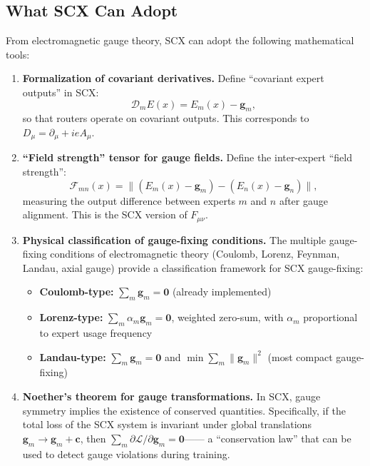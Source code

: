\documentclass[12pt,a4paper]{article}
\theoremstyle{remark}
\newcommand{\gaugeparam}{\mathbf{g}}
\begin{document}
\subsection{What SCX Can Adopt}

From electromagnetic gauge theory, SCX can adopt the following mathematical tools:

\begin{enumerate}[label=\textbf{(E\arabic*)}]
    \item \textbf{Formalization of covariant derivatives.} Define ``covariant expert outputs'' in SCX:
    \begin{equation}
        \mathcal{D}_m E(x) = E_m(x) - \gaugeparam_m,
    \end{equation}
    so that routers operate on covariant outputs. This corresponds to $D_\mu = \partial_\mu + i e A_\mu$.

    \item \textbf{``Field strength'' tensor for gauge fields.} Define the inter-expert ``field strength'':
    \begin{equation}
        \mathcal{F}_{mn}(x) = \|(E_m(x) - \gaugeparam_m) - (E_n(x) - \gaugeparam_n)\|,
    \end{equation}
    measuring the output difference between experts $m$ and $n$ after gauge alignment. This is the SCX version of $F_{\mu\nu}$.

    \item \textbf{Physical classification of gauge-fixing conditions.} The multiple gauge-fixing conditions of electromagnetic theory
    (Coulomb, Lorenz, Feynman, Landau, axial gauge) provide a classification framework for SCX gauge-fixing:
    \begin{itemize}
        \item \textbf{Coulomb-type:} $\sum_m \gaugeparam_m = \mathbf{0}$ (already implemented)
        \item \textbf{Lorenz-type:} $\sum_m \alpha_m \gaugeparam_m = \mathbf{0}$,
        weighted zero-sum, with $\alpha_m$ proportional to expert usage frequency
        \item \textbf{Landau-type:} $\sum_m \gaugeparam_m = \mathbf{0}$ and
        $\min \sum_m \|\gaugeparam_m\|^2$ (most compact gauge-fixing)
    \end{itemize}

    \item \textbf{Noether's theorem for gauge transformations.} In SCX, gauge symmetry implies the existence of conserved quantities.
    Specifically, if the total loss of the SCX system is invariant under global translations $\gaugeparam_m \to \gaugeparam_m + \mathbf{c}$,
    then $\sum_m \partial\mathcal{L}/\partial\gaugeparam_m = \mathbf{0}$——
    a ``conservation law'' that can be used to detect gauge violations during training.
\end{enumerate}
\end{document}

